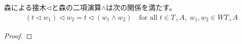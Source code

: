 		\begin{proposition}[接木と森の二項演算との関係]\label{prop:接木と森の二項演算との関係} %
			森による接木$\lhd$と森の二項演算$\land$は次の関係を満たす。
			\begin{equation*}\begin{split} %
				(t\lhd w_1)\lhd w_2 = t\lhd (w_1\land w_2)
				\quad\text{for all }t\in T_+A,\;w_1,w_2\in WT_+A
			\end{split}\end{equation*} %
		\end{proposition} %
		\begin{proof} %
		\end{proof} %

